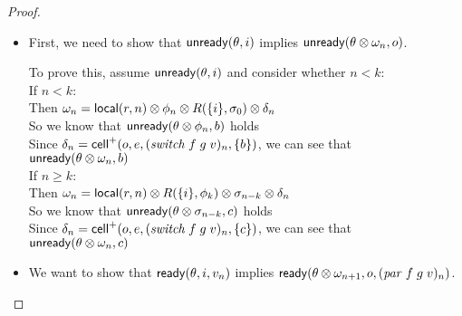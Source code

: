 \begin{proof}
\begin{itemize}
\item First, we need to show that $\mathsf{unready}({\theta}, {i})$ implies $\mathsf{unready}({\theta \otimes \omega_n}, {o})$. 

  \begin{tabbedproof}
    \oo To prove this, assume $\mathsf{unready}({\theta}, {i})$ and consider whether $n < k$:\\
    \oo If $n < k$:\\
    \ooo Then $\omega_n = \mathsf{local}({r}, {n}) \otimes \phi_n \otimes R(\{{i}\}, \sigma_0) \otimes \delta_n$ \\
    \ooo So we know that $\mathsf{unready}({\theta \otimes \phi_n}, {b})$ holds \\
    \ooo Since $\delta_n = \mathsf{cell}^{+}({o}, {e}, {(\mathit{switch}\;f\;g\;v)_n}, {\{{b}\}})$, we can see that \\
    \ooo $\mathsf{unready}({\theta \otimes \omega_n}, {b})$ \\
    \oo If $n \geq k$: \\
    \ooo Then $\omega_n = \mathsf{local}({r}, {n}) \otimes R(\{{i}\}, \phi_k) \otimes \sigma_{n-k} \otimes \delta_n$ \\
    \ooo So we know that $\mathsf{unready}({\theta \otimes \sigma_{n-k}}, {c})$ holds \\
    \ooo Since $\delta_n = \mathsf{cell}^{+}({o}, {e}, {(\mathit{switch}\;f\;g\;v)_n}, {\{{c}\}})$, we can see that \\
    \ooo $\mathsf{unready}({\theta \otimes \omega_n}, {c})$ \\
  \end{tabbedproof}

\item We want to show that $\mathsf{ready}({\theta}, {i}, {v_n})$ implies $\mathsf{ready}({\theta \otimes \omega_{n+1}}, {o}, {(\mathit{par}\;f\;g\;v)_n})$. 


\end{itemize}
\end{proof}
